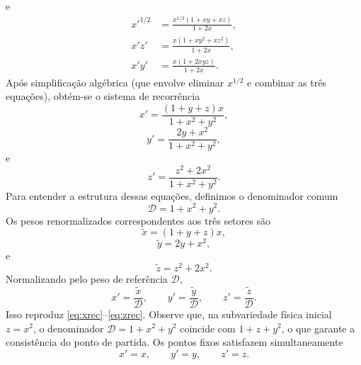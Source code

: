 \documentclass[12pt,a4paper]{article}
\begin{document}
%
e
%
\begin{align}
    x'^{1/2}
    &=
    \frac{x^{1/2}(1+x y+x z)}{1+2x},
    \label{eq:xprime_half_p4}
    \\[4pt]
    x' z'
    &=
    \frac{x(1+x y^2+x z^2)}{1+2x},
    \label{eq:xprimezprime_p4}
    \\[4pt]
    x' y'
    &=
    \frac{x(1+2 x y z)}{1+2x}.
    \label{eq:xprimeyprime_p4}
\end{align}
%
Após simplificação algébrica (que envolve eliminar \(x^{1/2}\) e
combinar as três equações), obtém-se o sistema de recorrência
%
\begin{equation}
    \boxed{
    x'
    =
    \frac{(1+y+z)x}
         {1+x^2+y^2},
    }
    \label{eq:xrec}
\end{equation}
%
\begin{equation}
    \boxed{
    y'
    =
    \frac{2y+x^2}
         {1+x^2+y^2},
    }
    \label{eq:yrec}
\end{equation}
%
e
%
\begin{equation}
    \boxed{
    z'
    =
    \frac{z^2+2x^2}
         {1+x^2+y^2}.
    }
    \label{eq:zrec}
\end{equation}
%
Para entender a estrutura dessas equações, definimos o denominador
comum
%
\begin{equation}
    \mathcal D=1+x^2+y^2.
    \label{eq:D_p4}
\end{equation}
%
Os pesos renormalizados correspondentes aos três setores são
%
\begin{equation}
    \widetilde x=(1+y+z)x,
    \label{eq:x_tilde_p4}
\end{equation}
%
\begin{equation}
    \widetilde y=2y+x^2,
    \label{eq:y_tilde_p4}
\end{equation}
%
e
%
\begin{equation}
    \widetilde z=z^2+2x^2.
    \label{eq:z_tilde_p4}
\end{equation}
%
Normalizando pelo peso de referência \(\mathcal D\),
%
\begin{equation}
    x'=\frac{\widetilde x}{\mathcal D},
    \qquad
    y'=\frac{\widetilde y}{\mathcal D},
    \qquad
    z'=\frac{\widetilde z}{\mathcal D}.
\end{equation}
%
Isso reproduz \eqref{eq:xrec}--\eqref{eq:zrec}. Observe que, na
subvariedade física inicial \(z=x^2\), o denominador
\(\mathcal D=1+x^2+y^2\) coincide com \(1+z+y^2\), o que garante a
consistência do ponto de partida. Os pontos fixos satisfazem simultaneamente
%
\begin{equation}
    x'=x,
    \qquad
    y'=y,
    \qquad
    z'=z.
    \label{eq:fixed_conditions_p4}
\end{equation}
\end{document}
